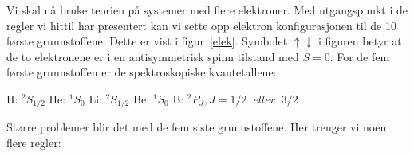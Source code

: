 Vi skal n{\aa} bruke teorien p{\aa} systemer med flere elektroner. Med
utgangspunkt i de regler vi hittil har presentert kan vi sette opp
elektron konfigurasjonen til de 10 f{\o}rste grunnstoffene.
Dette er vist i figur~\ref{elek}.
Symbolet $\uparrow \downarrow$ i figuren betyr at de to elektronene
er i en antisymmetrisk spinn tilstand med $S = 0$.
For de fem f{\o}rste grunnstoffen er
de spektroskopiske kvantetallene:
%
\begin{center}
H: $^2S_{1/2}$\hspace{0.5cm} He: $^1S_0$\hspace{0.5cm} Li: $^2S_{1/2}$
\hspace{0.5cm} Be: $^1S_0$\hspace{0.5cm} B: $^2P_J,
J = 1/2 \;\;eller\;\; 3/2$
\end{center}
%
St{\o}rre problemer blir det med de fem siste grunnstoffene.
Her trenger vi noen flere regler:
%
